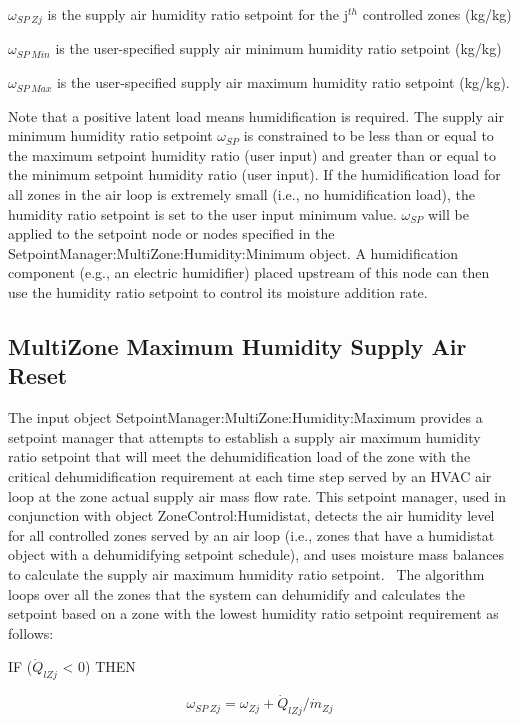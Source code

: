 \({\omega_{SP~Zj}}\) is the supply air humidity ratio setpoint for the j\(^{th}\) controlled zones (kg/kg)

\({\omega_{SP~Min}}\) is the user-specified supply air minimum humidity ratio setpoint (kg/kg)

\({\omega_{SP~Max}}\) is the user-specified supply air maximum humidity ratio setpoint (kg/kg).

Note that a positive latent load means humidification is required. The supply air minimum humidity ratio setpoint \({\omega_{SP}}\) is constrained to be less than or equal to the maximum setpoint humidity ratio (user input) and greater than or equal to the minimum setpoint humidity ratio (user input). If the humidification load for all zones in the air loop is extremely small (i.e., no humidification load), the humidity ratio setpoint is set to the user input minimum value. \({\omega_{SP}}\) will be applied to the setpoint node or nodes specified in the SetpointManager:MultiZone:Humidity:Minimum object. A humidification component (e.g., an electric humidifier) placed upstream of this node can then use the humidity ratio setpoint to control its moisture addition rate.

\subsection{MultiZone Maximum Humidity Supply Air Reset}\label{multizone-maximum-humidity-supply-air-reset}

The input object SetpointManager:MultiZone:Humidity:Maximum provides a setpoint manager that attempts to establish a supply air maximum humidity ratio setpoint that will meet the dehumidification load of the zone with the critical dehumidification requirement at each time step served by an HVAC air loop at the zone actual supply air mass flow rate. This setpoint manager, used in conjunction with object ZoneControl:Humidistat, detects the air humidity level for all controlled zones served by an air loop (i.e., zones that have a humidistat object with a dehumidifying setpoint schedule), and uses moisture mass balances to calculate the supply air maximum humidity ratio setpoint.~ The algorithm loops over all the zones that the system can dehumidify and calculates the setpoint based on a zone with the lowest humidity ratio setpoint requirement as follows:

IF (\({\dot Q_{lZj}}\) \textless{} 0) THEN

\begin{equation}
{\omega_{SP~Zj}} = {\omega_{Zj}} + {{{{\dot Q}_{lZj}}} / {{{\dot m}_{Zj}}}}
\end{equation}

